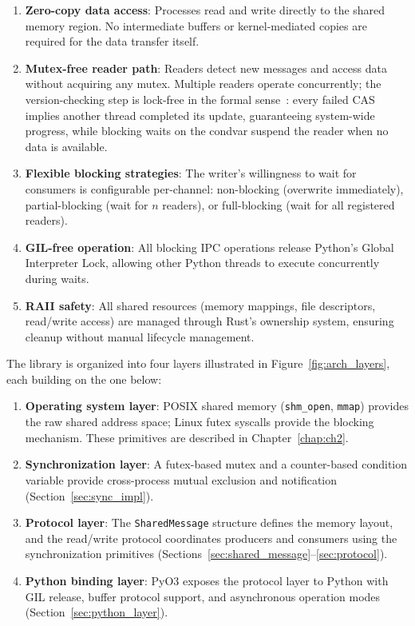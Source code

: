 \begin{enumerate}
    \item \textbf{Zero-copy data access}: Processes read and write directly to the shared memory region. No intermediate buffers or kernel-mediated copies are required for the data transfer itself.

    \item \textbf{Mutex-free reader path}: Readers detect new messages and access data without acquiring any mutex. Multiple readers operate concurrently; the version-checking step is lock-free in the formal sense~\cite{herlihy2012}: every failed CAS implies another thread completed its update, guaranteeing system-wide progress, while blocking waits on the condvar suspend the reader when no data is available.

    \item \textbf{Flexible blocking strategies}: The writer's willingness to wait for consumers is configurable per-channel: non-blocking (overwrite immediately), partial-blocking (wait for $n$ readers), or full-blocking (wait for all registered readers).

    \item \textbf{GIL-free operation}: All blocking IPC operations release Python's Global Interpreter Lock, allowing other Python threads to execute concurrently during waits.

    \item \textbf{RAII safety}: All shared resources (memory mappings, file descriptors, read/\-write access) are managed through Rust's ownership system, ensuring cleanup without manual lifecycle management.
\end{enumerate}

The library is organized into four layers illustrated in Figure~\ref{fig:arch_layers}, each building on the one below:

\begin{enumerate}
    \item \textbf{Operating system layer}: POSIX shared memory (\texttt{shm\_open}, \texttt{mmap}) provides the raw shared address space; Linux futex syscalls provide the blocking mechanism. These primitives are described in Chapter~\ref{chap:ch2}.

    \item \textbf{Synchronization layer}: A futex-based mutex and a counter-based condition variable provide cross-process mutual exclusion and notification (Section~\ref{sec:sync_impl}).

    \item \textbf{Protocol layer}: The \texttt{SharedMessage} structure defines the memory layout, and the read/write protocol coordinates producers and consumers using the synchronization primitives (Sections~\ref{sec:shared_message}--\ref{sec:protocol}).

    \item \textbf{Python binding layer}: PyO3 exposes the protocol layer to Python with GIL release, buffer protocol support, and asynchronous operation modes (Section~\ref{sec:python_layer}).
\end{enumerate}

